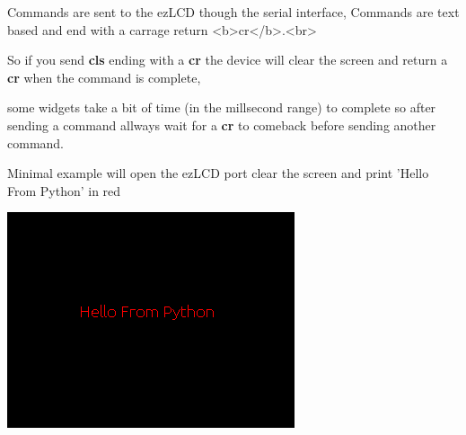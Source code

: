 \begin{DoxyVerb}Commands are sent to the ezLCD though the serial interface, Commands are text based and end with a carrage return <b>cr</b>.<br>
\end{DoxyVerb}
 So if you send {\bfseries cls} ending with a {\bfseries cr} the device will clear the screen and return a {\bfseries cr} when the command is complete,\par
 some widgets take a bit of time (in the millsecond range) to complete so after sending a command allways wait for a {\bfseries cr} to comeback before sending another command.\par
 \par
 Minimal example will open the ez\-L\-C\-D port clear the screen and print 'Hello From Python' in red \par
  
\begin{DoxyImageNoCaption}
  \mbox{\includegraphics{minimal.png}}
\end{DoxyImageNoCaption}
 
